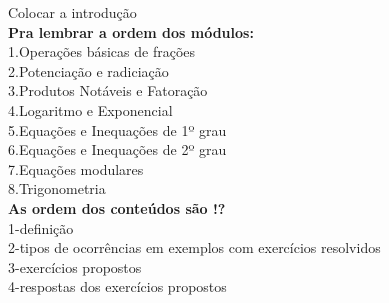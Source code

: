 	Colocar a introdução\\
		
	\textbf{Pra lembrar a ordem dos módulos:}\\
	1.Operações básicas de frações\\
	2.Potenciação e radiciação\\
	3.Produtos Notáveis e Fatoração\\
	4.Logaritmo e Exponencial\\
	5.Equações e Inequações de 1º grau\\
	6.Equações e Inequações de 2º grau\\
	7.Equações modulares\\
	8.Trigonometria\\
	
	\textbf{As ordem dos conteúdos são !?}\\
	1-definição\\
	2-tipos de ocorrências em exemplos com exercícios resolvidos\\
	3-exercícios propostos\\
	4-respostas dos exercícios propostos\\



 
